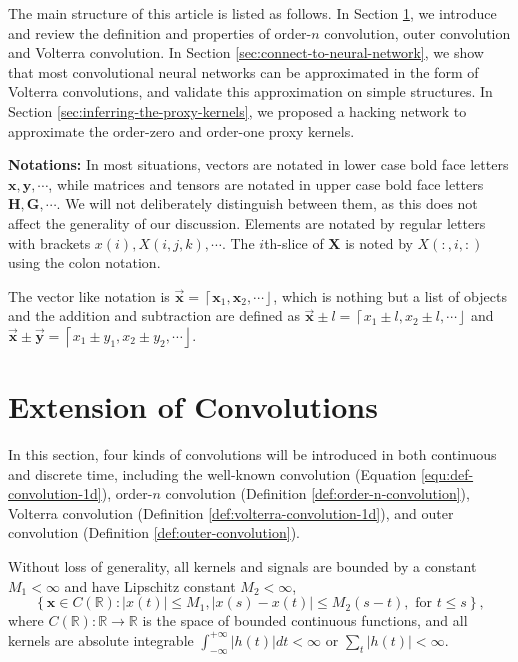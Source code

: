 \documentclass[twoside,11pt]{article}
\def\tvar#1{\mathbf{#1}} %
\def\vsymb#1{\vec{\mathbf{#1}}}
\def\intinf{\int_{-\infty}^{+\infty}\!}
\def\lcerfl#1{\left\lceil{#1}\right\rfloor}
\begin{document}
The main structure of this article is listed as follows.
In Section \ref{sec:extension-of-convolutions}, we introduce and review the definition and properties of order-\(n\) convolution, outer convolution and Volterra convolution. 
In Section \ref{sec:connect-to-neural-network}, we show that most convolutional neural networks can be approximated in the form of Volterra convolutions, and validate this approximation on simple structures. 
In Section \ref{sec:inferring-the-proxy-kernels}, we proposed a hacking network to approximate the order-zero and order-one proxy kernels.

\textbf{Notations: }
In most situations, vectors are notated in lower case bold face letters \(\tvar{x}, \tvar{y}, \cdots\), while matrices and tensors are notated in upper case bold face letters \(\tvar{H}, \tvar{G}, \cdots\).
We will not deliberately distinguish between them, as this does not affect the generality of our discussion.
Elements are notated by regular letters with brackets \(x(i), X(i,j,k), \cdots\). The \(i\)th-slice of \(\tvar{X}\) is noted by  \(X(:,i,:)\) using the colon notation.

The vector like notation is \(\vsymb{x} = \lcerfl{\tvar{x}_1, \tvar{x}_2, \cdots}\), which is nothing but a list of objects and the addition and subtraction are defined as \(\vsymb{x} \pm l = \lcerfl{x_1 \pm l, x_2 \pm l, \cdots}\) and \(\vsymb{x} \pm \vsymb{y} = \lcerfl{x_1 \pm y_1, x_2 \pm y_2, \cdots}\).

\section{Extension of Convolutions}
\label{sec:extension-of-convolutions}

In this section, four kinds of convolutions will be introduced in both continuous and discrete time, including the well-known convolution (Equation \ref{equ:def-convolution-1d}), order-\(n\) convolution (Definition \ref{def:order-n-convolution}), Volterra convolution (Definition \ref{def:volterra-convolution-1d}), and outer convolution (Definition \ref{def:outer-convolution}).

Without loss of generality, all kernels and signals are bounded by a constant \(M_1 < \infty\) and have Lipschitz constant \(M_2 < \infty\),
\begin{equation*}
  \left\{
  \tvar{x} \in C(\mathbb{R}) : | x(t) | \le M_1, | x(s) - x(t) | \le M_2(s - t), \text{ for } t \le s
  \right\},
\end{equation*}
where \(C(\mathbb{R}): \mathbb{R} \rightarrow \mathbb{R}\) is the space of bounded continuous functions,
and all kernels are absolute integrable \(\intinf | h(t) | dt < \infty\) or \(\sum_t | h(t) | < \infty\).
\end{document}
